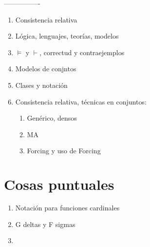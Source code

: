 \documentclass[letterpaper,DIV=12,12pt]{scrbook}
\begin{document}
        ----------------
        \begin{enumerate}
            \item Consistencia relativa
            \item Lógica, lenguajes, teorías, modelos
            \item $\vDash$ y $\vdash$, correctud y contraejemplos
            \item Modelos de conjntos
            \item Clases y notación
            \item Consistencia relativa, técnicas en conjuntos:
            \begin{enumerate}
                \item Genérico, densos
                \item MA
                \item Forcing y uso de Forcing
            \end{enumerate}
        \end{enumerate}

        \chapter*{Cosas puntuales}
        \begin{enumerate}
            \item Notación para funciones cardinales
            \item G deltas y F sigmas
            \item 
        \end{enumerate}
\end{document}

